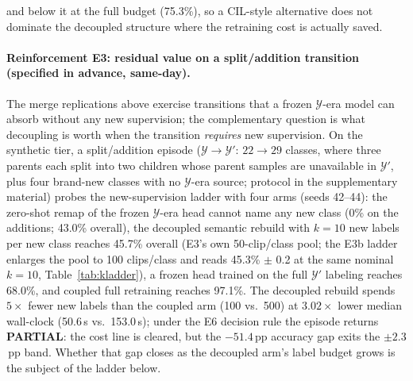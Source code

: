 and below it at the full budget (75.3\%), so a CIL-style alternative does not dominate the decoupled structure where the retraining cost is actually saved.

\paragraph{Reinforcement E3: residual value on a split/addition transition (specified in advance, same-day).}
The merge replications above exercise transitions that a frozen $\mathcal{Y}$-era model can absorb without any new supervision; the complementary question is what decoupling is worth when the transition \emph{requires} new supervision. On the synthetic tier, a split/addition episode ($\mathcal{Y}\to\mathcal{Y}'$: $22\to29$ classes, where three parents each split into two children whose parent samples are unavailable in $\mathcal{Y}'$, plus four brand-new classes with no $\mathcal{Y}$-era source; protocol in the supplementary material) probes the new-supervision ladder with four arms (seeds 42--44): the zero-shot remap of the frozen $\mathcal{Y}$-era head cannot name any new class (0\% on the additions; 43.0\% overall), the decoupled semantic rebuild with $k{=}10$ new labels per new class reaches 45.7\% overall (E3's own 50-clip/class pool; the E3b ladder enlarges the pool to 100 clips/class and reads 45.3\% $\pm$ 0.2 at the same nominal $k{=}10$, Table~\ref{tab:kladder}), a frozen head trained on the full $\mathcal{Y}'$ labeling reaches 68.0\%, and coupled full retraining reaches 97.1\%. The decoupled rebuild spends $5\times$ fewer new labels than the coupled arm (100 vs.\ 500) at $3.02\times$ lower median wall-clock (50.6\,s vs.\ 153.0\,s); under the E6 decision rule the episode returns \textbf{PARTIAL}: the cost line is cleared, but the $-51.4$\,pp accuracy gap exits the $\pm2.3$\,pp band. Whether that gap closes as the decoupled arm's label budget grows is the subject of the ladder below.

